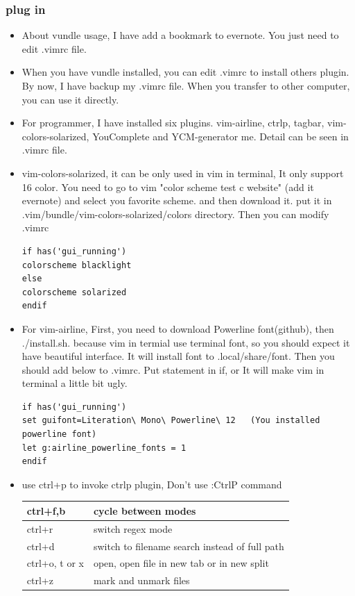 \documentclass[a4paper,12pt,twoside]{book}
\begin{document}
\subsubsection{plug in}
\begin{itemize}
\item About vundle usage, I have add a bookmark to evernote. You just need to edit .vimrc file.  
\item When you have vundle installed, you can edit .vimrc to install others plugin. By now, I have backup my .vimrc file. When you transfer to other computer, you can use it directly. 

\item For programmer, I have installed six plugins.  vim-airline, ctrlp, tagbar,  vim-colors-solarized, YouComplete and YCM-generator me. Detail can be seen in .vimrc file.

\item vim-colors-solarized, it can be only used in vim in terminal, It only support 16 color. You need to go to  vim "color scheme test c website" (add it evernote) and select you favorite scheme. and then download it. put it in .vim/bundle/vim-colors-solarized/colors directory. Then you can modify .vimrc
\begin{verbatim}
if has('gui_running')
colorscheme blacklight
else
colorscheme solarized
endif 
\end{verbatim}

 
\item For vim-airline,  First, you need to download Powerline font(github), then ./install.sh. because vim in termial use terminal font, so you should expect it have beautiful interface. It will install font to .local/share/font. Then you should add below to .vimrc.  Put statement in if, or It will make vim in terminal a little bit ugly. 
\begin{verbatim}
if has('gui_running')
set guifont=Literation\ Mono\ Powerline\ 12   (You installed powerline font)
let g:airline_powerline_fonts = 1
endif
\end{verbatim}
\item use ctrl+p to invoke ctrlp plugin, Don't use :CtrlP command  \\ 
\begin{tabular}{|p{}|p{}|}
\hline 
ctrl+f,b  & cycle between modes \\ 
\hline 
ctrl+r & switch regex mode  \\ 
\hline 
ctrl+d & switch to filename search instead of full path \\ 
\hline 
ctrl+o, t or x & open, open file in new tab or in new split \\ 
\hline 
ctrl+z  & mark and unmark files \\ 
\hline 
\end{tabular} 


\end{itemize}
\end{document}
